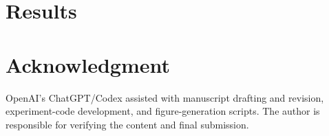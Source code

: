 \documentclass[10pt,journal,letterpaper]{IEEEtran}
\begin{document}


\section{Results}



\section*{Acknowledgment}
OpenAI's ChatGPT/Codex assisted with manuscript drafting and revision, experiment-code development, and figure-generation scripts. The author is responsible for verifying the content and final submission.


\end{document}
